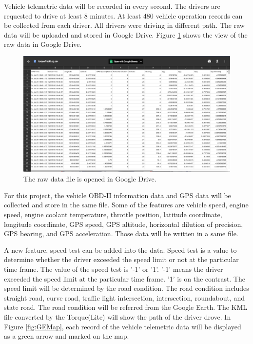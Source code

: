 Vehicle telemetric data will be recorded in every second. The drivers are requested to drive at least 8 minutes. At least 480 vehicle operation records can be collected from each driver. All drivers were driving in different path. The raw data will be uploaded and stored in Google Drive. Figure \ref{fig:GDfile} shows  the view of the raw data in Google Drive.

\begin{figure}[hbt!]\centering
\includegraphics[width=.75\textwidth]{image/GDfile}
\caption{The raw data file is opened in Google Drive.}
\label{fig:GDfile}
\end{figure}

For this project, the vehicle OBD-II information data and GPS data will be collected and store in the same file. Some of the features are vehicle speed, engine speed, engine coolant temperature, throttle position, latitude coordinate, longitude coordinate, GPS speed, GPS altitude, horizontal dilution of precision, GPS bearing, and GPS acceleration. Those data will be written in a same file.

A new feature, speed test can be added into the data. Speed test is a value to determine whether the driver exceeded the speed limit or not at the particular time frame. The value of the speed test is '-1' or '1'. '-1' means the driver exceeded the speed limit at the particular time frame. '1' is on the contrast. The speed limit will be determined by the road condition. The road condition includes straight road, curve road, traffic light intersection, intersection, roundabout, and state road. The road condition will be referred from the Google Earth. The KML file converted by the Torque(Lite) will show the path of the driver drove. In Figure \ref{fig:GEMap}, each record of the vehicle telemetric data will be displayed as a green arrow and marked on the map. 

